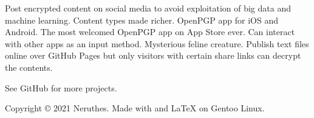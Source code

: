 \hfill
\begin{minipage}[t]{15.5em}
	\raggedright


	{Post encrypted content on social media to avoid exploitation of big data and machine learning.
		Content types made richer.}
	{OpenPGP app for iOS and Android. The most welcomed OpenPGP app on App Store ever.
		Can interact with other apps as an input method.}
	{Mysterious feline creature.}
	{Publish text files online over GitHub Pages but only visitors with certain share links can decrypt the contents.}

	\vspace{25pt}

	\footnotesize
	See GitHub for more projects.
\end{minipage}






\vfill

\begin{minipage}[t]{\textwidth}
	\footnotesize

	Copyright {\copyright} 2021 Neruthes.
	Made with  and {\LaTeX} on Gentoo Linux.
\end{minipage}









